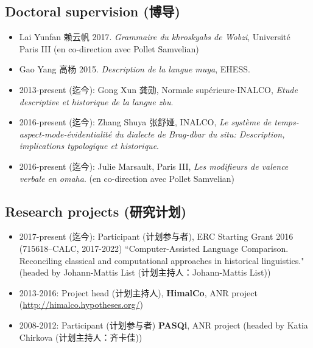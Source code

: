 \documentclass[oldfontcommands,oneside,a4paper,11pt]{article}
\newcommand{\zh}[1]{{\cn #1}}
\newcommand{\langue}[2]{#2}
\newcommand{\lingua}[3]{#2 (\zh{#3})}
\begin{document}
\subsection*{\lingua{Encadrement d'étudiants}{Doctoral supervision}{博导}}
\begin{itemize}
\item Lai Yunfan \zh{赖云帆} 2017. \textit{Grammaire du khroskyabs de Wobzi}, Université Paris III (en co-direction avec Pollet Samvelian)
\item Gao Yang \zh{高杨} 2015. \textit{Description de la langue muya}, EHESS.
\item 2013-\lingua{présent}{present}{迄今}: Gong Xun \zh{龚勋}, Normale supérieure-INALCO, \textit{Etude descriptive et historique de la langue zbu}.
\item 2016-\lingua{présent}{present}{迄今}: Zhang Shuya  \zh{张舒娅}, INALCO,  \textit{Le système de temps-aspect-mode-évidentialité du dialecte de Brag-dbar du situ: Description, implications typologique et historique}. 
\item 2016-\lingua{présent}{present}{迄今}: Julie Marsault, Paris III, \textit{Les modifieurs de valence verbale en omaha}. (en co-direction avec Pollet Samvelian)
\end{itemize}

\subsection*{\lingua{Projets de recherche}{Research projects}{研究计划}}
\begin{itemize}
\item 2017-\lingua{présent}{present}{迄今}: \lingua{Participant}{Participant}{计划参与者}, ERC Starting Grant 2016 (715618–CALC, 2017-2022) ``Computer-Assisted Language Comparison. Reconciling classical and computational approaches in historical linguistics." (\lingua{porteur du projet: Johann-Mattis List}{headed by Johann-Mattis List}{计划主持人：Johann-Mattis List})
\item  2013-2016: \lingua{Porteur}{Project head}{计划主持人}, \textbf{HimalCo}, \langue{projet ANR}{ANR project} (\url{http://himalco.hypotheses.org/})
\item 2008-2012: \lingua{Participant}{Participant}{计划参与者} \textbf{PASQi}, \langue{projet ANR}{ANR project} (\lingua{vec Katia Chirkova (porteur) et Alexis Michaud}{headed by Katia Chirkova}{计划主持人：齐卡佳})

\end{itemize}
\end{document}

